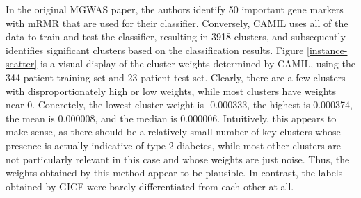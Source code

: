 In the original MGWAS paper, the authors identify 50 important gene markers with mRMR that are used for their classifier. Conversely, CAMIL uses all of the data to train and test the classifier, resulting in 3918 clusters, and subsequently identifies significant clusters based on the classification results. Figure \ref{instance-scatter} is a visual display of the cluster weights determined by CAMIL, using the 344 patient training set and 23 patient test set. Clearly, there are a few clusters with disproportionately high or low weights, while most clusters have weights near 0. Concretely, the lowest cluster weight is -0.000333, the highest is 0.000374, the mean is 0.000008, and the median is 0.000006. Intuitively, this appears to make sense, as there should be a relatively small number of key clusters whose presence is actually indicative of type 2 diabetes, while most other clusters are not particularly relevant in this case and whose weights are just noise. Thus, the weights obtained by this method appear to be plausible. In contrast, the labels obtained by GICF were barely differentiated from each other at all.

